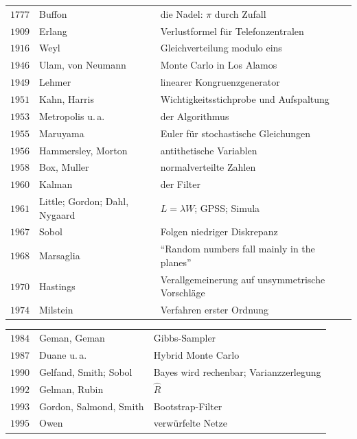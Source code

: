 \begin{merksatz}
\begin{center}
{\small
\renewcommand{\arraystretch}{1.42}
\begin{tabular}{@{}P{1.0cm}P{3.4cm}P{4.2cm}@{}}
\toprule
$1777$ & Buffon & die Nadel: $\pi$ durch Zufall\\
$1909$ & Erlang & Verlustformel für Telefonzentralen\\
$1916$ & Weyl & Gleichverteilung modulo eins\\
$1946$ & Ulam, von Neumann & Monte Carlo in Los Alamos\\
$1949$ & Lehmer & linearer Kongruenzgenerator\\
$1951$ & Kahn, Harris & Wichtigkeitsstichprobe und Aufspaltung\\
$1953$ & Metropolis u.\,a. & der Algorithmus\\
$1955$ & Maruyama & Euler für stochastische Gleichungen\\
$1956$ & Hammersley, Morton & antithetische Variablen\\
$1958$ & Box, Muller & normalverteilte Zahlen\\
$1960$ & Kalman & der Filter\\
$1961$ & Little; Gordon; Dahl, Nygaard & $L = \lambda W$; GPSS; Simula\\
$1967$ & Sobol & Folgen niedriger Diskrepanz\\
$1968$ & Marsaglia & \enquote{Random numbers fall mainly in the planes}\\
$1970$ & Hastings & Verallgemeinerung auf unsymmetrische Vorschläge\\
$1974$ & Milstein & Verfahren erster Ordnung\\
\bottomrule
\end{tabular}}
\end{center}
\begin{center}
{\small
\renewcommand{\arraystretch}{1.42}
\begin{tabular}{@{}P{1.0cm}P{3.4cm}P{4.2cm}@{}}
\toprule
$1984$ & Geman, Geman & Gibbs-Sampler\\
$1987$ & Duane u.\,a. & Hybrid Monte Carlo\\
$1990$ & Gelfand, Smith; Sobol & Bayes wird rechenbar; Varianzzerlegung\\
$1992$ & Gelman, Rubin & $\hat R$\\
$1993$ & Gordon, Salmond, Smith & Bootstrap-Filter\\
$1995$ & Owen & verwürfelte Netze\\

\end{tabular}}
\end{center}
\end{merksatz}
